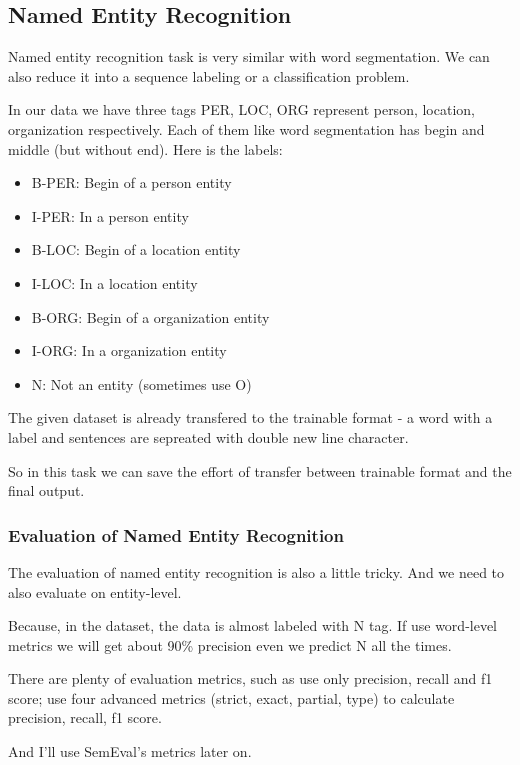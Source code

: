 \subsection{Named Entity Recognition}
\label{sec:ner}

Named entity recognition task is very similar with word segmentation. We can also reduce it into a sequence labeling or a classification problem.

In our data we have three tags PER, LOC, ORG represent person, location, organization respectively. Each of them like word segmentation has begin and middle (but without end). Here is the labels:

\begin{itemize}
    \item B-PER: Begin of a person entity
    \item I-PER: In a person entity
    \item B-LOC: Begin of a location entity
    \item I-LOC: In a location entity
    \item B-ORG: Begin of a organization entity
    \item I-ORG: In a organization entity
    \item N: Not an entity (sometimes use O)
\end{itemize}

The given dataset is already transfered to the trainable format - a word with a label and sentences are sepreated with double new line character.

So in this task we can save the effort of transfer between trainable format and the final output.

\subsubsection*{Evaluation of Named Entity Recognition}
\label{sec:ner_eval}

The evaluation of named entity recognition is also a little tricky. And we need to also evaluate on entity-level.

Because, in the dataset, the data is almost labeled with N tag. If use word-level metrics we will get about 90\% precision even we predict N all the times.

There are plenty of evaluation metrics, such as  use only precision, recall and f1 score;  use four advanced metrics (strict, exact, partial, type) to calculate precision, recall, f1 score.

And I'll use SemEval's metrics later on.
